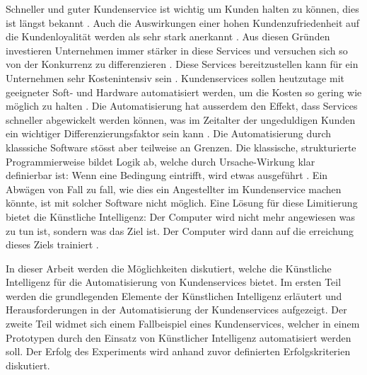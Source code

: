 \documentclass[12pt, twoside, table]{extarticle}
\begin{document}

Schneller und guter Kundenservice ist wichtig um Kunden halten zu können, dies ist längst bekannt . Auch die Auswirkungen einer hohen Kundenzufriedenheit auf die Kundenloyalität werden als sehr stark anerkannt . Aus diesen Gründen investieren Unternehmen immer stärker in diese Services und versuchen sich so von der Konkurrenz zu differenzieren . Diese Services bereitzustellen kann für ein Unternehmen sehr Kostenintensiv sein .  Kundenservices sollen heutzutage mit geeigneter Soft- und Hardware automatisiert werden, um die Kosten so gering wie möglich zu halten . Die Automatisierung hat ausserdem den Effekt, dass Services schneller abgewickelt werden können, was im Zeitalter der ungeduldigen Kunden ein wichtiger Differenzierungsfaktor sein kann . Die Automatisierung durch klasssiche Software stösst aber teilweise  an Grenzen. Die klassische, strukturierte Programmierweise bildet Logik ab, welche durch Ursache-Wirkung klar definierbar ist: Wenn eine Bedingung eintrifft, wird etwas ausgeführt . Ein Abwägen von Fall zu fall, wie dies ein Angestellter im Kundenservice machen könnte, ist mit solcher Software nicht möglich. Eine Lösung für diese Limitierung bietet die Künstliche Intelligenz: Der Computer wird nicht mehr angewiesen was zu tun ist, sondern was das Ziel ist. Der Computer wird dann auf die erreichung dieses Ziels trainiert .

In dieser Arbeit werden die Möglichkeiten diskutiert, welche die Künstliche Intelligenz für die Automatisierung von Kundenservices bietet. Im ersten Teil werden die grundlegenden Elemente der Künstlichen Intelligenz erläutert und Herausforderungen in der Automatisierung der Kundenservices aufgezeigt.  Der zweite Teil widmet sich einem Fallbeispiel eines Kundenservices, welcher in einem Prototypen durch den Einsatz von Künstlicher Intelligenz automatisiert werden soll. Der Erfolg des Experiments wird anhand zuvor definierten Erfolgskriterien diskutiert.
\end{document}
